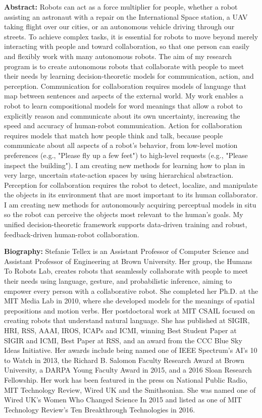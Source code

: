 \noindent \textbf{Abstract:} 
Robots can act as a force multiplier for people, whether a robot assisting an astronaut with a repair on the International Space station, a UAV taking flight over our cities, or an autonomous vehicle driving through our streets. To achieve complex tasks, it is essential for robots to move beyond merely interacting with people and toward collaboration, so that one person can easily and flexibly work with many autonomous robots. The aim of my research program is to create autonomous robots that collaborate with people to meet their needs by learning decision-theoretic models for communication, action, and perception. Communication for collaboration requires models of language that map between sentences and aspects of the external world. My work enables a robot to learn compositional models for word meanings that allow a robot to explicitly reason and communicate about its own uncertainty, increasing the speed and accuracy of human-robot communication. Action for collaboration requires models that match how people think and talk, because people communicate about all aspects of a robot's behavior, from low-level motion preferences (e.g., "Please fly up a few feet") to high-level requests (e.g., "Please inspect the building"). I am creating new methods for learning how to plan in very large, uncertain state-action spaces by using hierarchical abstraction. Perception for collaboration requires the robot to detect, localize, and manipulate the objects in its environment that are most important to its human collaborator. I am creating new methods for autonomously acquiring perceptual models in situ so the robot can perceive the objects most relevant to the human's goals. My unified decision-theoretic framework supports data-driven training and robust, feedback-driven human-robot collaboration. 

\vspace{3em}

\vfill{}
\noindent \textbf{Biography:}  
 Stefanie Tellex is an Assistant Professor of Computer Science and Assistant Professor of Engineering at Brown University. Her group, the Humans To Robots Lab, creates robots that seamlessly collaborate with people to meet their needs using language, gesture, and probabilistic inference, aiming to empower every person with a collaborative robot. She completed her Ph.D. at the MIT Media Lab in 2010, where she developed models for the meanings of spatial prepositions and motion verbs. Her postdoctoral work at MIT CSAIL focused on creating robots that understand natural language. She has published at SIGIR, HRI, RSS, AAAI, IROS, ICAPs and ICMI, winning Best Student Paper at SIGIR and ICMI, Best Paper at RSS, and an award from the CCC Blue Sky Ideas Initiative. Her awards include being named one of IEEE Spectrum's AI's 10 to Watch in 2013, the Richard B. Salomon Faculty Research Award at Brown University, a DARPA Young Faculty Award in 2015, and a 2016 Sloan Research Fellowship. Her work has been featured in the press on National Public Radio, MIT Technology Review, Wired UK and the Smithsonian. She was named one of Wired UK's Women Who Changed Science In 2015 and listed as one of MIT Technology Review's Ten Breakthrough Technologies in 2016. 
\clearpage{}



